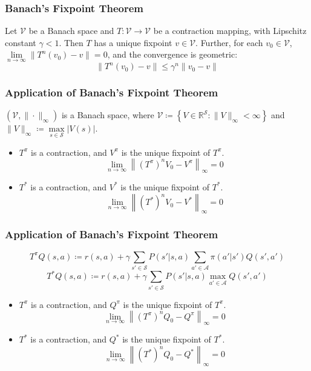 \documentclass[UTF8,11pt,colorlinks,compress,openany]{beamer}%
\begin{document}
\begin{frame}\frametitle{Banach's Fixpoint Theorem}
	\begin{theorem}
		Let $\mathcal{V}$ be a Banach space and $T:\mathcal{V}\to\mathcal{V}$ be a contraction mapping, with Lipschitz constant $\gamma<1$. Then $T$ has a unique fixpoint $v\in\mathcal{V}$. Further, for each $v_0\in\mathcal{V}$, $\lim\limits_{n\to\infty}\|T^n(v_0)-v\|=0$, and the convergence is geometric:
		\[\|T^n(v_0)-v\|\leq\gamma^n\|v_0-v\|\]
	\end{theorem}
\end{frame}

\begin{frame}\frametitle{Application of Banach's Fixpoint Theorem}
	\begin{theorem}
		$(\mathcal{V},\|\cdot\|_\infty)$ is a Banach space, where
		$\mathcal{V}\coloneqq \left\{V\in\mathbb{R}^{\mathcal{S}}: \|V\|_\infty<\infty\right\}$ and $\|V\|_\infty\coloneqq \max\limits_{s\in\mathcal{S}}|V(s)|$.
	\end{theorem}
	\begin{block}{}
		\begin{itemize}
			\item $T^\pi$ is a contraction, and $V^\pi$ is the unique fixpoint of $T^\pi$.
			\[\lim\limits_{n\to\infty}\left\|(T^\pi)^nV_0-V^\pi\right\|_\infty=0\]
			\item $T^*$ is a contraction, and $V^*$ is the unique fixpoint of $T^*$.
			\[\lim\limits_{n\to\infty}\left\|(T^*)^nV_0-V^*\right\|_\infty=0\]
		\end{itemize}
	\end{block}
\end{frame}

\begin{frame}\frametitle{Application of Banach's Fixpoint Theorem}
\setlength\abovedisplayskip{0pt}
\setlength\belowdisplayskip{0pt}
	\begin{block}{}
		\[T^\pi Q(s,a)\coloneqq r(s,a)+\gamma\sum\limits_{s'\in\mathcal{S}}P(s'|s,a)\sum\limits_{a'\in\mathcal{A}}\pi(a'|s')Q(s',a')\]
		\[T^* Q(s,a)\coloneqq r(s,a)+\gamma\sum\limits_{s'\in\mathcal{S}}P(s'|s,a)\max\limits_{a'\in\mathcal{A}}Q(s',a')\]
		\begin{itemize}
			\item $T^\pi$ is a contraction, and $Q^\pi$ is the unique fixpoint of $T^\pi$.
			\[\lim\limits_{n\to\infty}\left\|(T^\pi)^nQ_0-Q^\pi\right\|_\infty=0\]
			\item $T^*$ is a contraction, and $Q^*$ is the unique fixpoint of $T^*$.
			\[\lim\limits_{n\to\infty}\left\|(T^*)^nQ_0-Q^*\right\|_\infty=0\]
		\end{itemize}
	\end{block}
\end{frame}
\end{document}
